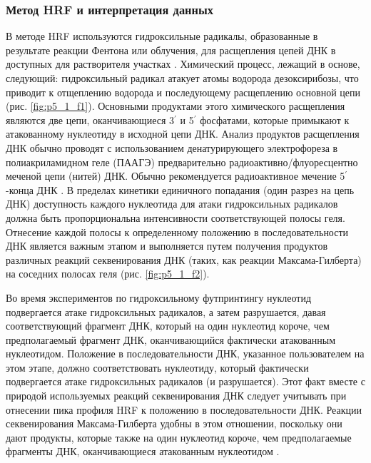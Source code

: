     \subsubsection{Метод HRF и интерпретация данных}
     В методе HRF используются гидроксильные радикалы, образованные в результате реакции Фентона или облучения, для расщепления цепей ДНК в доступных для растворителя участках \cite{jain_footprinting_2008-1}. Химический процесс, лежащий в основе, следующий: гидроксильный радикал атакует атомы водорода дезоксирибозы, что приводит к отщеплению водорода и последующему расщеплению основной цепи (рис. \ref{fig:p5_1_f1}). Основными продуктами этого химического расщепления являются две цепи, оканчивающиеся 3$^\prime$ и 5$^\prime$ фосфатами, которые примыкают к атакованному нуклеотиду в исходной цепи ДНК. Анализ продуктов расщепления ДНК обычно проводят с использованием денатурирующего электрофореза в полиакриламидном геле (ПААГЭ) предварительно радиоактивно/флуоресцентно меченой цепи (нитей) ДНК. Обычно рекомендуется радиоактивное мечение 5$^\prime$-конца ДНК \cite{jain_footprinting_2008-1}. В пределах кинетики единичного попадания (один разрез на цепь ДНК) доступность каждого нуклеотида для атаки гидроксильных радикалов должна быть пропорциональна интенсивности соответствующей полосы геля. Отнесение каждой полосы к определенному положению в последовательности ДНК является важным этапом и выполняется путем получения продуктов различных реакций секвенирования ДНК (таких, как реакции Максама-Гилберта) на соседних полосах геля (рис. \ref{fig:p5_1_f2}).
    
    Во время экспериментов по гидроксильному футпринтингу нуклеотид подвергается атаке гидроксильных радикалов, а затем разрушается, давая соответствующий фрагмент ДНК, который на один нуклеотид короче, чем предполагаемый фрагмент ДНК, оканчивающийся фактически атакованным нуклеотидом. Положение в последовательности ДНК, указанное пользователем на этом этапе, должно соответствовать нуклеотиду, который фактически подвергается атаке гидроксильных радикалов (и разрушается). Этот факт вместе с природой используемых реакций секвенирования ДНК следует учитывать при отнесении пика профиля HRF к положению в последовательности ДНК. Реакции секвенирования Максама-Гилберта удобны в этом отношении, поскольку они дают продукты, которые также на один нуклеотид короче, чем предполагаемые фрагменты ДНК, оканчивающиеся атакованным нуклеотидом \cite{maxam_new_1977}.
    
